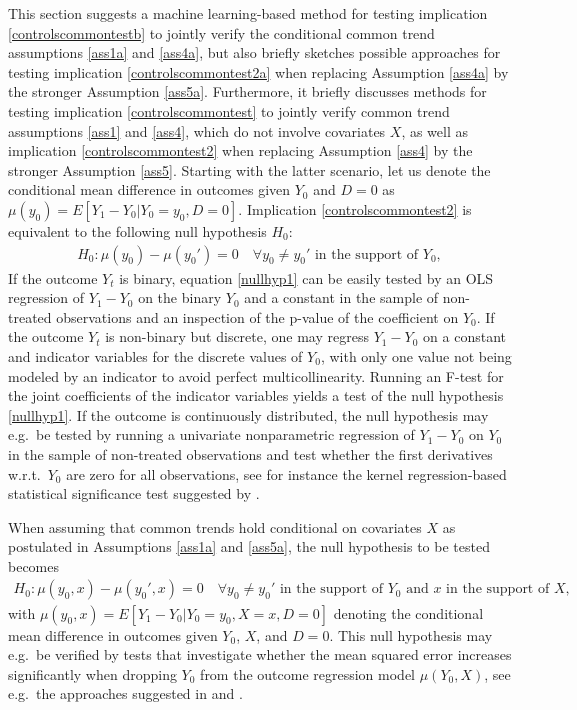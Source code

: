 {	This section suggests a machine learning-based method for testing implication \eqref{controlscommontestb} to jointly verify the conditional common trend assumptions \ref{ass1a} and \ref{ass4a}, but also briefly sketches possible approaches for testing implication \eqref{controlscommontest2a}
	when replacing Assumption \ref{ass4a} by the stronger Assumption \ref{ass5a}. Furthermore, it briefly discusses methods for testing implication \eqref{controlscommontest} to jointly verify common trend assumptions \ref{ass1} and \ref{ass4}, which do not involve covariates $X$, as well as implication \eqref{controlscommontest2}	when replacing Assumption \ref{ass4} by the stronger Assumption \ref{ass5}. Starting with the latter scenario, let us denote the conditional mean difference in outcomes given $Y_0$ and $D=0$ as $\mu(y_0)=E[Y_1-Y_0|Y_0=y_0,D=0]$. Implication \eqref{controlscommontest2} is equivalent to the following null hypothesis $H_0$:
	\begin{eqnarray}\label{nullhyp1}
		H_0: \mu(y_0)-\mu(y_0')=0\quad\forall y_0\neq y_0'\textrm{ in the support of }Y_0,
	\end{eqnarray}
	If the outcome $Y_t$ is binary, equation \eqref{nullhyp1} can be easily tested by an OLS regression of $Y_1-Y_0$ on the binary $Y_0$ and a constant in the sample of non-treated observations and an inspection of the p-value of the coefficient on $Y_0$. If the outcome $Y_t$ is non-binary but discrete, one may regress $Y_1-Y_0$ on a constant and indicator variables for the discrete values of $Y_0$, with only one value not being modeled by an indicator to avoid perfect multicollinearity. Running an F-test for the joint coefficients of the indicator variables yields a test of the null hypothesis \eqref{nullhyp1}. If the outcome is continuously distributed, the null hypothesis may e.g.\ be tested by running a univariate nonparametric regression of $Y_1-Y_0$ on $Y_0$ in the sample of non-treated observations and test whether the first derivatives w.r.t.\ $Y_0$ are zero for all observations, see for instance the kernel regression-based statistical significance test suggested by \cite{racine1997consistent}.
	
	When assuming that common trends hold conditional on covariates $X$ as postulated in Assumptions \ref{ass1a} and \ref{ass5a}, the null hypothesis to be tested becomes
	\begin{eqnarray}\label{nullhyp1a}
		H_0: \mu(y_0,x)-\mu(y_0',x)=0\quad\forall y_0\neq y_0'\textrm{ in the support of }Y_0\textrm{ and }x\textrm{ in the support of }X,
	\end{eqnarray}
	with $\mu(y_0,x)=E[Y_1-Y_0|Y_0=y_0, X=x, D=0]$ denoting the conditional mean difference in outcomes given $Y_0$, $X$, and $D=0$. This null hypothesis may e.g.\ be verified by tests that investigate whether the mean squared error increases significantly when dropping $Y_0$ from the outcome regression model  $\mu(Y_0,X)$, see e.g.\ the approaches suggested in \citet{HuberKueck2022} and \citet{kook2024algorithmagnostic}. 
	
}
